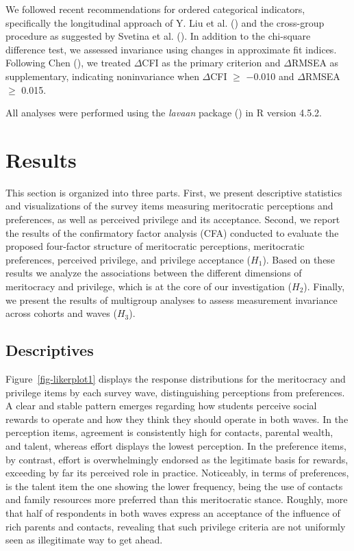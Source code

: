 \documentclass[
  13pt,
]{article}
\begin{document}
We followed recent recommendations for ordered categorical indicators,
specifically the longitudinal approach of Y. Liu et al.
() and the cross-group procedure as
suggested by Svetina et al.
(). In addition to the
chi-square difference test, we assessed invariance using changes in
approximate fit indices. Following Chen
(), we treated \(\Delta\)CFI
as the primary criterion and \(\Delta\)RMSEA as supplementary,
indicating noninvariance when \(\Delta\)CFI \(\geq\) −0.010 and
\(\Delta\)RMSEA \(\geq\) 0.015.

All analyses were performed using the \emph{lavaan} package
() in R version 4.5.2.

\section{Results}\label{results}

This section is organized into three parts. First, we present
descriptive statistics and visualizations of the survey items measuring
meritocratic perceptions and preferences, as well as perceived privilege
and its acceptance. Second, we report the results of the confirmatory
factor analysis (CFA) conducted to evaluate the proposed four-factor
structure of meritocratic perceptions, meritocratic preferences,
perceived privilege, and privilege acceptance (\(H_1\)). Based on these
results we analyze the associations between the different dimensions of
meritocracy and privilege, which is at the core of our investigation
(\(H_2\)). Finally, we present the results of multigroup analyses to
assess measurement invariance across cohorts and waves (\(H_3\)).

\subsection{Descriptives}\label{descriptives}

Figure~\ref{fig-likerplot1} displays the response distributions for the
meritocracy and privilege items by each survey wave, distinguishing
perceptions from preferences. A clear and stable pattern emerges
regarding how students perceive social rewards to operate and how they
think they should operate in both waves. In the perception items,
agreement is consistently high for contacts, parental wealth, and
talent, whereas effort displays the lowest perception. In the preference
items, by contrast, effort is overwhelmingly endorsed as the legitimate
basis for rewards, exceeding by far its perceived role in practice.
Noticeably, in terms of preferences, is the talent item the one showing
the lower frequency, being the use of contacts and family resources more
preferred than this meritocratic stance. Roughly, more that half of
respondents in both waves express an acceptance of the influence of rich
parents and contacts, revealing that such privilege criteria are not
uniformly seen as illegitimate way to get ahead.
\end{document}
